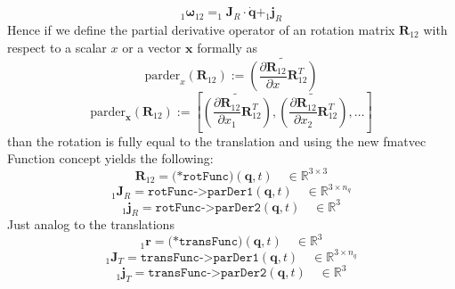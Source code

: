 \documentclass{report}
\newcommand{\bs}[1]{\boldsymbol #1}
\begin{document}
\begin{equation}
_1\bs{\omega}_{12}=_1\bs{J}_R\cdot \dot{\bs{q}} + _1\bs{j}_R
\end{equation}
Hence if we define the partial derivative operator of an rotation matrix $\bs{R}_{12}$ with respect to a scalar $x$ or a vector $\bs{x}$ formally as
\begin{equation}
\text{parder}_x(\bs{R}_{12}):=\widetilde{\left(\frac{\partial\bs{R}_{12}}{\partial x}\bs{R}_{12}^T\right)}
\end{equation}
\begin{equation}
\text{parder}_{\bs{x}}(\bs{R}_{12}):=\left[\widetilde{\left(\frac{\partial\bs{R}_{12}}{\partial x_1}\bs{R}_{12}^T\right)},\widetilde{\left(\frac{\partial\bs{R}_{12}}{\partial x_2}\bs{R}_{12}^T\right)},\dots\right]
\end{equation}
than the rotation is fully equal to the translation and using the new fmatvec Function concept yields the following:
\begin{equation}
\bs{R}_{12}=\texttt{(*rotFunc)}(\bs{q},t)\quad\in\mathbb{R}^{3\times 3}
\end{equation}
\begin{equation}
_1\bs{J}_R=\texttt{rotFunc->parDer1}(\bs{q},t)\quad\in\mathbb{R}^{3\times n_q}
\end{equation}
\begin{equation}
_1\bs{j}_R=\texttt{rotFunc->parDer2}(\bs{q},t)\quad\in\mathbb{R}^3
\end{equation}
Just analog to the translations
\begin{equation}
_1\bs{r}=\texttt{(*transFunc)}(\bs{q},t)\quad\in\mathbb{R}^3
\end{equation}
\begin{equation}
_1\bs{J}_T=\texttt{transFunc->parDer1}(\bs{q},t)\quad\in\mathbb{R}^{3\times n_q}
\end{equation}
\begin{equation}
_1\bs{j}_T=\texttt{transFunc->parDer2}(\bs{q},t)\quad\in\mathbb{R}^3
\end{equation}
\end{document}

